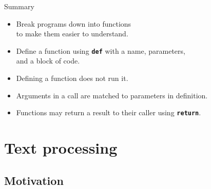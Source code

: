 \documentclass[aspectratio=169,usenames,dvipsnames]{beamer}
\begin{document}

\begin{frame}{Summary}
    \begin{itemize}
        \item Break programs down into functions \\
            to make them easier to understand.
        \item Define a function using \texttt{\textbf{\textcolor{OliveGreen}{def}}}
            with a name, parameters,\\ and a block of code.
        \item Defining a function does not run it.
        \item Arguments in a call are matched to parameters in definition.
        \item Functions may return a result to their caller using
            \texttt{\textbf{\textcolor{OliveGreen}{return}}}.
    \end{itemize}
\end{frame}





\section{Text processing}
\subsection{Motivation}
\frame{\tableofcontents[currentsection]}

\end{document}

